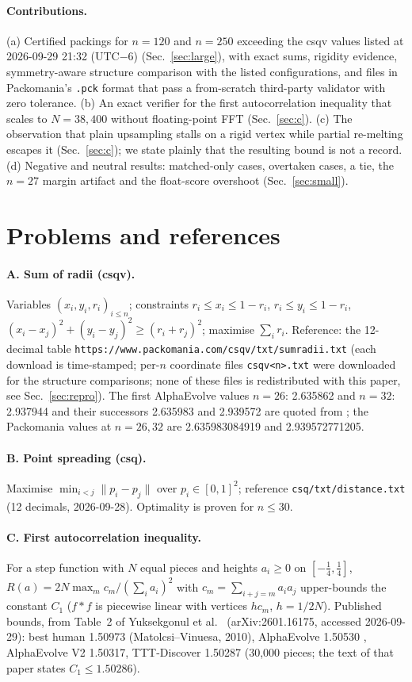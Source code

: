 \documentclass[10pt]{article}
\begin{document}
\paragraph{Contributions.} (a) Certified packings for $n=120$ and $n=250$ exceeding the csqv values listed at 2026-09-29 21:32 (UTC$-6$) (Sec.~\ref{sec:large}), with exact sums, rigidity evidence, symmetry-aware structure comparison with the listed configurations, and files in Packomania's \texttt{.pck} format that pass a from-scratch third-party validator with zero tolerance.
(b) An exact verifier for the first autocorrelation inequality that scales to $N=38{,}400$ without floating-point FFT (Sec.~\ref{sec:c}).
(c) The observation that plain upsampling stalls on a rigid vertex while partial re-melting escapes it (Sec.~\ref{sec:c}); we state plainly that the resulting bound is not a record.
(d) Negative and neutral results: matched-only cases, overtaken cases, a tie, the $n=27$ margin artifact and the float-score overshoot (Sec.~\ref{sec:small}).

\section{Problems and references}
\paragraph{A. Sum of radii (csqv).} Variables $(x_i,y_i,r_i)_{i\le n}$; constraints $r_i\le x_i\le1-r_i$, $r_i\le y_i\le1-r_i$,
$(x_i-x_j)^2+(y_i-y_j)^2\ge(r_i+r_j)^2$; maximise $\sum_ir_i$. Reference: the 12-decimal table \texttt{https://www.packomania.com/csqv/txt/sumradii.txt} (each download is time-stamped;
per-$n$ coordinate files \texttt{csqv<n>.txt} were downloaded for the structure comparisons; none of these files is redistributed with this paper, see Sec.~\ref{sec:repro}). The first AlphaEvolve values
$n=26$: 2.635862 and $n=32$: 2.937944 and their successors 2.635983 and 2.939572 are quoted from \cite{tttdiscover}; the Packomania values at $n=26,32$ are 2.635983084919 and 2.939572771205.
\paragraph{B. Point spreading (csq).} Maximise $\min_{i<j}\|p_i-p_j\|$ over $p_i\in[0,1]^2$; reference \texttt{csq/txt/distance.txt} (12 decimals, 2026-09-28). Optimality is proven for $n\le30$.
\paragraph{C. First autocorrelation inequality.} For a step function with $N$ equal pieces and heights $a_i\ge0$ on $[-\tfrac14,\tfrac14]$,
$R(a)=2N\max_mc_m/(\sum_ia_i)^2$ with $c_m=\sum_{i+j=m}a_ia_j$ upper-bounds the constant $C_1$ ($f{*}f$ is piecewise linear with vertices $h c_m$, $h=1/2N$).
Published bounds, from Table~2 of Yuksekgonul et al.\ \cite{tttdiscover} (arXiv:2601.16175, accessed 2026-09-29): best human 1.50973 (Matolcsi--Vinuesa, 2010), AlphaEvolve 1.50530 \cite{alphaevolve},
AlphaEvolve V2 1.50317, TTT-Discover 1.50287 (30{,}000 pieces; the text of that paper states $C_1\le1.50286$).
\end{document}
